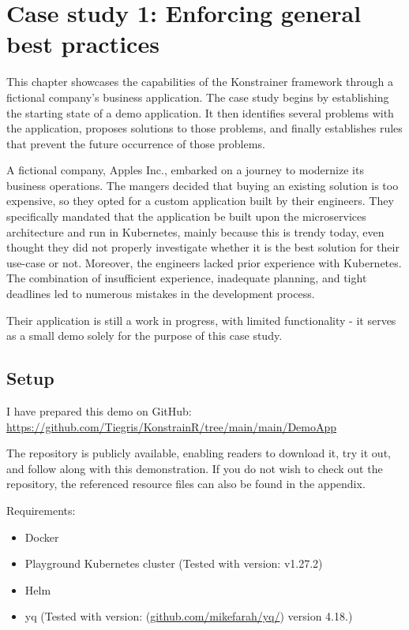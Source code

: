 \chapter{Case study 1: Enforcing general best practices}
\label{chap:case_study1}

This chapter showcases the capabilities of the Konstrainer framework through a fictional company's business application. The case study begins by establishing the starting state of a demo application. It then identifies several problems with the application, proposes solutions to those problems, and finally establishes rules that prevent the future occurrence of those problems.

A fictional company, Apples Inc., embarked on a journey to modernize its business operations. The mangers decided that buying an existing solution is too expensive, so they opted for a custom application built by their engineers. They specifically mandated that the application be built upon the microservices architecture and run in Kubernetes, mainly because this is trendy today, even thought they did not properly investigate whether it is the best solution for their use-case or not. Moreover, the engineers lacked prior experience with Kubernetes. The combination of insufficient experience, inadequate planning, and tight deadlines led to numerous mistakes in the development process.

Their application is still a work in progress, with limited functionality - it serves as a small demo solely for the purpose of this case study.

\section{Setup}

I have prepared this demo on GitHub: \url{https://github.com/Tiegris/KonstrainR/tree/main/main/DemoApp}

The repository is publicly available, enabling readers to download it, try it out, and follow along with this demonstration. If you do not wish to check out the repository, the referenced resource files can also be found in the appendix.

Requirements:

\begin{itemize}
    \item Docker
    \item Playground Kubernetes cluster (Tested with version: v1.27.2)
    \item Helm
    \item yq (Tested with version: (\url{github.com/mikefarah/yq/}) version 4.18.)
\end{itemize}

